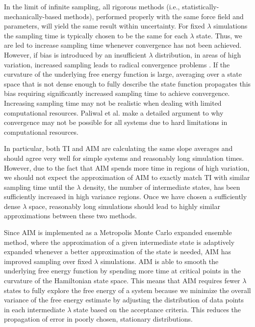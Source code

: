 In the limit of infinite sampling, all rigorous methods (i.e., statistically-mechanically-based methods), performed properly with the same force field and parameters, will yield the same result within uncertainty. For fixed $\lambda$ simulations the sampling time is typically chosen to be the same for each $\lambda$ state. Thus, we are led to increase sampling time whenever convergence has not been achieved. However, if bias is introduced by an insufficient $\lambda$ distribution, in areas of high variation, increased sampling leads to radical convergence problems \cite{Shyu2009, SteinBrecher2010}. If the curvature of the underlying free energy function is large, averaging over a state space that is not dense enough to fully describe the state function propagates this bias requiring significantly increased sampling time to achieve convergence. Increasing sampling time may not be realistic when dealing with limited computational resources. Paliwal et al. \cite{Paliwal2011} make a detailed argument to why convergence may not be possible for all systems due to hard limitations in computational resources. 

In particular, both TI and AIM are calculating the same slope averages and should agree very well for simple systems and reasonably long simulation times. However, due to the fact that AIM spends more time in regions of high variation, we should not expect the approximation of AIM to exactly match TI with similar sampling time until the $\lambda$ density, the number of intermediate states, has been sufficiently increased in high variance regions. Once we have chosen a sufficiently dense $\lambda$ space, reasonably long simulations should lead to highly similar approximations between these two methods.

Since AIM is implemented as a Metropolis Monte Carlo \cite{Metropolis1953} expanded ensemble \cite{Lyubartsev1996} method, where the approximation of a given intermediate state is adaptively expanded whenever a better approximation of the state is needed, AIM has improved sampling over fixed $\lambda$ simulations. AIM is able to smooth the underlying free energy function by spending more time at critical points in the curvature of the Hamiltonian state space. This means that AIM requires fewer $\lambda$ states to fully explore the free energy of a system because we minimize the overall variance of the free energy estimate by adjusting the distribution of data points in each intermediate $\lambda$ state based on the acceptance criteria. This reduces the propagation of error in poorly chosen, stationary distributions. 

